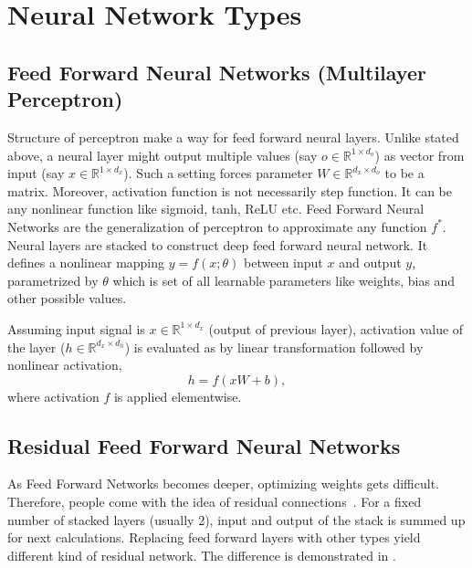 \section{Neural Network Types}
\label{sec:nnet_types}

\subsection{Feed Forward Neural Networks (Multilayer Perceptron)}

Structure of perceptron make a way for feed forward neural layers. 
Unlike stated above, a neural layer might output multiple values (say $o \in \mathbb{R}^{1 \times d_o}$) as vector from input (say $x \in \mathbb{R}^{1 \times d_x}$). 
Such a setting forces parameter $W \in \mathbb{R}^{d_x \times d_o} $ to be a matrix. 
Moreover, activation function is not necessarily step function. 
It can be any nonlinear function like sigmoid, tanh, ReLU etc. 
Feed Forward Neural Networks are the generalization of perceptron to approximate any function $f^*$. 
Neural layers are stacked to construct deep feed forward neural network. 
It defines a nonlinear mapping $y=f(x;\theta)$ between input $x$ and output $y$, parametrized by $\theta$ which is set of all learnable parameters like weights, bias and other possible values.

Assuming input signal is $x \in \mathbb{R}^{1 \times d_x}$ (output of previous layer), 
activation value of the layer ($h \in \mathbb{R}^{d_x \times d_h}$) is evaluated as by linear transformation followed by nonlinear activation, 
\begin{equation}
\label{eqn:mlpact}
h = f (x W + b),
\end{equation}
where activation $f$ is applied elementwise.

\subsection{Residual Feed Forward Neural Networks}

As Feed Forward Networks becomes deeper, optimizing weights gets difficult. 
Therefore, people come with the idea of residual connections~\cite{he_deep_2015}. 
For a fixed number of stacked layers (usually 2), input and output of the stack is summed up for next calculations. 
Replacing feed forward layers with other types yield different kind of residual network. 
The difference is demonstrated in . 


